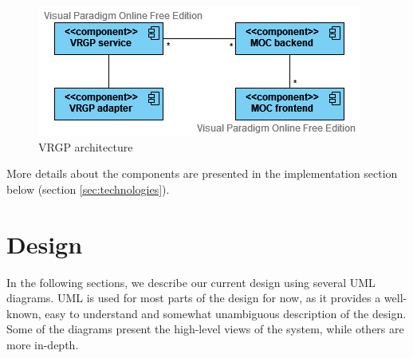 \begin{figure}[ht]
	\centering
	\includegraphics[width=\linewidth]{images/vrgp-architecture}
	\caption{VRGP architecture}
	\label{fig:vrgp-architecture}
\end{figure}


More details about the components are presented in the implementation section below (section \ref{sec:technologies}).

\section{Design}\label{sec:design}

In the following sections, we describe our current design using several UML diagrams. UML is used for most parts of the design for now, as it provides a well-known, easy to understand and somewhat unambiguous description of the design. Some of the diagrams present the high-level views of the system, while others are more in-depth.

